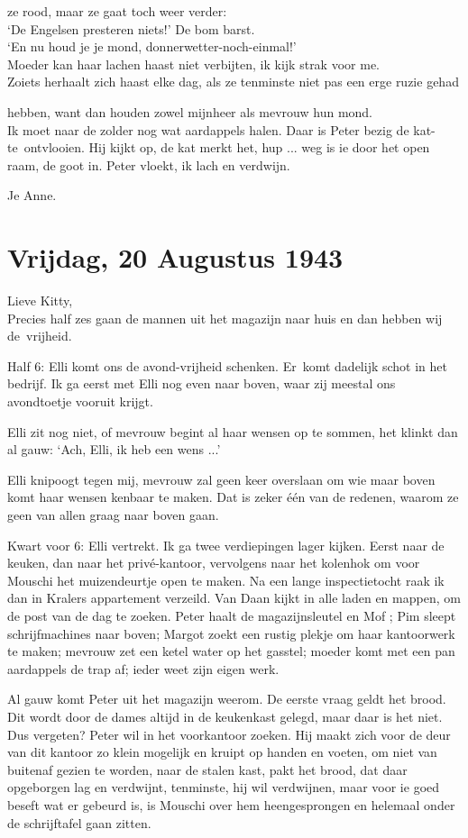 \documentclass{book}
\begin{document}
ze rood, maar ze gaat toch weer verder:\\`De Engelsen presteren niets!'
De bom barst.\\`En nu houd je je mond,
donnerwetter-noch-einmal!'\\Moeder kan haar lachen haast niet verbijten,
ik kijk strak voor me.\\Zoiets herhaalt zich haast elke dag, als ze
tenminste niet pas een erge ruzie gehad

hebben, want dan houden zowel mijnheer als mevrouw hun mond.\\Ik moet
naar de zolder nog wat aardappels halen. Daar is Peter bezig de
kat-te~ontvlooien. Hij kijkt op, de kat merkt het, hup ... weg is ie
door het open raam, de goot in. Peter vloekt, ik lach en verdwijn.

Je Anne.

\chapter{Vrijdag, 20 Augustus 1943}

Lieve Kitty,\\Precies half zes gaan de mannen uit het magazijn naar huis
en dan hebben wij de~vrijheid.

Half 6: Elli komt ons de avond-vrijheid schenken. Er~komt dadelijk schot
in het bedrijf. Ik ga eerst met Elli nog even naar boven, waar zij
meestal ons avondtoetje vooruit krijgt.

Elli zit nog niet, of mevrouw begint al haar wensen op te sommen, het
klinkt dan al gauw: `Ach, Elli, ik heb een wens ...'

Elli knipoogt tegen mij, mevrouw zal geen keer overslaan om wie maar
boven komt haar wensen kenbaar te maken. Dat is zeker één van de
redenen, waarom ze geen van allen graag naar boven gaan.

Kwart voor 6: Elli vertrekt. Ik ga twee verdiepingen lager kijken. Eerst
naar de keuken, dan naar het privé-kantoor, vervolgens naar het kolenhok
om voor Mouschi het muizendeurtje open te maken. Na een lange
inspectietocht raak ik dan in Kralers appartement verzeild. Van Daan
kijkt in alle laden en mappen, om de post van de dag te zoeken. Peter
haalt de magazijnsleutel en Mof ; Pim sleept schrijfmachines naar boven;
Margot zoekt een rustig plekje om haar kantoorwerk te maken; mevrouw zet
een ketel water op het gasstel; moeder komt met een pan aardappels de
trap af; ieder weet zijn eigen werk.

Al gauw komt Peter uit het magazijn weerom. De eerste vraag geldt het
brood. Dit wordt door de dames altijd in de keukenkast gelegd, maar daar
is het niet. Dus vergeten? Peter wil in het voorkantoor zoeken. Hij
maakt zich voor de deur van dit kantoor zo klein mogelijk en kruipt op
handen en voeten, om niet van buitenaf gezien te worden, naar de stalen
kast, pakt het brood, dat daar opgeborgen lag en verdwijnt, tenminste,
hij wil verdwijnen, maar voor ie goed beseft wat er gebeurd is, is
Mouschi over hem heengesprongen en helemaal onder de schrijftafel gaan
zitten.
\end{document}
